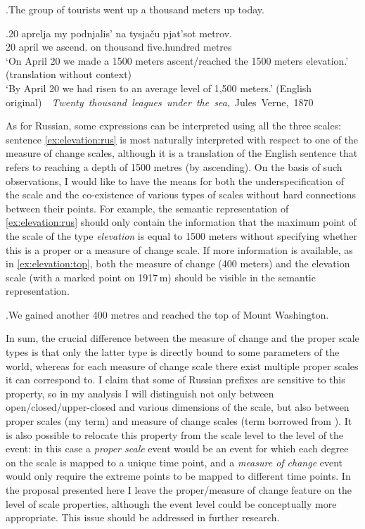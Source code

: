 \ex.\label{ex:elevation}The group of tourists went up a thousand meters up today.

\exg.\label{ex:elevation:rus}20 aprelja my podnjalis' na tysja\v{c}u pjat'sot metrov.\\
20 april we ascend. on thousand five.hundred metres\\
\trans `On April 20 we made a 1500 meters ascent/reached the 1500 meters elevation.' (translation without context)\\
`By April 20 we had risen to an average level of 1,500 meters.' (English original)~~\hbox{}\hfill\hbox{\textit{Twenty thousand leagues under the sea}, Jules Verne, 1870}

As for Russian, some expressions can be interpreted using all the three scales: sentence \ref{ex:elevation:rus} is most naturally interpreted with respect to one of the measure of change scales, although it is a translation of the English sentence that refers to reaching a depth of 1500 metres (by ascending). On the basis of such observations, I would like to have the means for both the underspecification of the scale and the co-existence of various types of scales without hard connections between their points. For example, the semantic representation of \ref{ex:elevation:rus} should only contain the information that the maximum point of the scale of the type \textit{elevation} is equal to 1500 meters without specifying whether this is a proper or a measure of change scale. If more information is available, as in \ref{ex:elevation:top}, both the measure of change (400 meters) and the elevation scale (with a marked point on 1917\,m) should be visible in the semantic representation.

\ex.\label{ex:elevation:top}We gained another 400 metres and reached the top of Mount Washington.

In sum, the crucial difference between the measure of change and the proper scale types is that only the latter type is directly bound to some parameters of the world, whereas for each measure of change scale there exist multiple proper scales it can correspond to. I claim that some of Russian prefixes are sensitive to this property, so in my analysis I will distinguish not only between open\slash closed\slash upper-closed and various dimensions of the scale, but also between proper scales (my term) and measure of change scales (term borrowed from \citealt{KennedyLevin:08}). It is also possible to relocate this property from the scale level to the level of the event: in this case a \textit{proper scale} event would be an event for which each degree on the scale is mapped to a unique time point, and a \textit{measure of change} event would only require the extreme points to be mapped to different time points. In the proposal presented here I leave the proper/measure of change feature on the level of scale properties, although the event level could be conceptually more appropriate. This issue should be addressed in further research.

